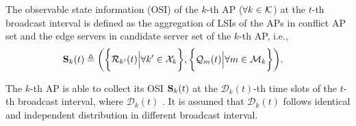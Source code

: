 \begin{definition}
    The observable state information (OSI) of the $k$-th AP ($\forall k\in\mathcal{K}$) at the $t$-th broadcast interval is defined as the aggregation of LSIs of the APs in {conflict AP set} and the edge servers in {candidate server set} of the $k$-th AP, i.e.,
    {\small
    \begin{align}
        \mathbf{S}_{k}(t) &\triangleq
        \bigg(
            \bigg\{\mathcal{R}_{k'}(t) \Big| \forall k'\in\mathcal{X}_{k}\bigg\},
            \bigg\{\mathcal{Q}_{m}(t) \Big| \forall m\in\mathcal{M}_{k}\bigg\}
        \bigg).
    \end{align}
    }%
    \label{def:OSI}
\end{definition}


The $k$-th AP is able to collect its OSI $\mathbf{S}_{k}(t)$ at the $\mathcal{D}_{k}(t)$-th time slots of the $t$-th broadcast interval, where $\mathcal{D}_{k}(t)$ .
It is assumed that $\mathcal{D}_{k}(t)$ follows identical and independent distribution in different broadcast interval.

